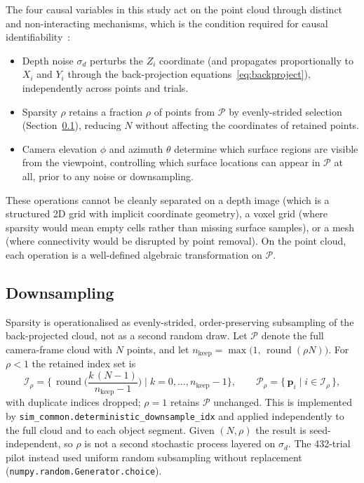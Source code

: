 \documentclass[11pt,a4paper]{report}
\begin{document}
The four causal variables in this study act on the point cloud through distinct
and non-interacting mechanisms, which is the condition required for causal
identifiability~\cite{pearl2009causality}:
\begin{itemize}
  \item Depth noise $\sigma_d$ perturbs the $Z_i$ coordinate (and propagates
        proportionally to $X_i$ and $Y_i$ through the back-projection
        equations~\eqref{eq:backproject}), independently across points and trials.
  \item Sparsity $\rho$ retains a fraction $\rho$ of points from
        $\mathcal{P}$ by evenly-strided selection
        (Section~\ref{sec:pointcloud_downsampling}), reducing $N$ without
        affecting the coordinates of retained points.
  \item Camera elevation $\phi$ and azimuth $\theta$ determine which surface regions
        are visible from the viewpoint, controlling which surface locations can
        appear in $\mathcal{P}$ at all, prior to any noise or downsampling.
\end{itemize}
These operations cannot be cleanly separated on a depth image (which is a
structured 2D grid with implicit coordinate geometry), a voxel grid (where
sparsity would mean empty cells rather than missing surface samples), or a mesh
(where connectivity would be disrupted by point removal).  On the point cloud,
each operation is a well-defined algebraic transformation on $\mathcal{P}$.

\subsection{Downsampling}
\label{sec:pointcloud_downsampling}

Sparsity is operationalised as evenly-strided, order-preserving subsampling of
the back-projected cloud, not as a second random draw. Let $\mathcal{P}$ denote
the full camera-frame cloud with $N$ points, and let
$n_{\text{keep}} = \max\!\bigl(1,\, \operatorname{round}(\rho N)\bigr)$.
For $\rho < 1$ the retained index set is
\begin{equation}
  \mathcal{I}_\rho
  = \Biggl\{\,
      \operatorname{round}\!\Biggl(\frac{k\,(N-1)}{n_{\text{keep}}-1}\Biggr)
      \;\Big|\;
      k = 0, \ldots, n_{\text{keep}}-1
    \Biggr\},
  \qquad
  \mathcal{P}_\rho
  = \bigl\{\, \mathbf{p}_i \;\big|\; i \in \mathcal{I}_\rho \,\bigr\},
  \label{eq:downsampled_cloud}
\end{equation}
with duplicate indices dropped; $\rho = 1$ retains $\mathcal{P}$ unchanged.
This is implemented by \texttt{sim\_common.deterministic\_downsample\_idx} and
applied independently to the full cloud and to each object segment. Given
$(N,\rho)$ the result is seed-independent, so $\rho$ is not a second stochastic
process layered on $\sigma_d$. The 432-trial pilot instead used uniform random
subsampling without replacement (\texttt{numpy.random.Generator.choice}).
\end{document}
